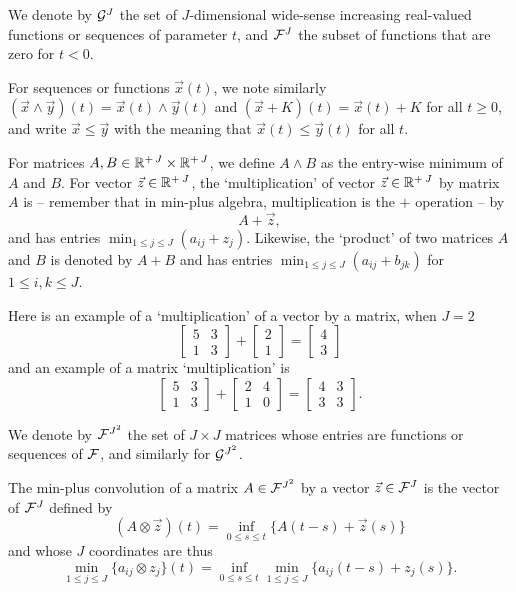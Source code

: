 We denote by $\mathcal G^J$ the set of $J$-dimensional wide-sense
increasing real-valued functions or sequences of parameter $t$,
and $\mathcal F^J$ the subset of functions that are zero for $t < 0$.

For sequences or functions $\vec{x}(t)$, we note similarly $(\vec{x} \wedge
\vec{y})(t) = \vec{x}(t)\wedge \vec{y}(t)$ and $(\vec{x} +K)(t)=\vec{x}(t) +
K$ for all $t \geq 0$, and write $ \vec{x} \leq \vec{y}$ with the
meaning that $\vec{x}(t) \leq \vec{y}(t)$ for all $t$.

For matrices $A, B \in \mathbb{R}^{+ \, J} \times  \mathbb{R}^{+ \, J}$,
we define $A \wedge B$ as the entry-wise minimum of $A$ and $B$. For vector $\vec{z} \in \mathbb{R}^{+ \: J}$,
the `multiplication' of  vector $\vec{z} \in \mathbb{R}^{+ \: J}$  by matrix $A$ is -- remember that in min-plus algebra, multiplication is the $+$ operation -- by
$$  A + \vec{z}, $$
and has entries $\min_{1 \leq j \leq J} (a_{ij} + z_j)$.
Likewise, the `product' of two matrices $A$ and  $B$ is denoted by $A + B$ and has entries $\min_{1 \leq j \leq J} (a_{ij} + b_{jk}) $ for $1 \leq i,k \leq J$.

Here is an example of a  `multiplication' of a vector by a matrix, when $J=2$
$$ \left[ \begin{array}{cc} 5 & 3 \\ 1 & 3 \end{array} \right] + \left[ \begin{array}{c} 2\\ 1 \end{array} \right]
= \left[ \begin{array}{c} 4 \\ 3 \end{array} \right]  $$
and an example of a matrix `multiplication' is
$$ \left[ \begin{array}{cc} 5 & 3 \\ 1 & 3 \end{array} \right] + \left[ \begin{array}{cc} 2 & 4 \\ 1 & 0 \end{array} \right]
= \left[ \begin{array}{cc} 4 & 3 \\ 3 & 3 \end{array} \right].  $$

We denote by $\mathcal F^{J^2}$ the set of $J \times J$ matrices whose entries are
functions or sequences of $\mathcal F$, and similarly for $\mathcal G^{J^2}$.

The min-plus convolution of a matrix $A  \in \mathcal F^{J^2}$ by a vector $\vec{z} \in \mathcal F^{J}$ is the vector of $\mathcal F^J$ defined by
$$ (A \otimes \vec{z})(t) = \inf_{0 \leq s \leq t} \{ A(t-s) + \vec{z}(s) \} $$
and whose $J$ coordinates are thus
$$ \min_{1 \leq j \leq J} \{ a_{ij} \otimes z_j \}(t) =  \inf_{0 \leq s \leq t} \min_{1 \leq j \leq J} \{ a_{ij}(t-s) + z_j(s) \}. $$

